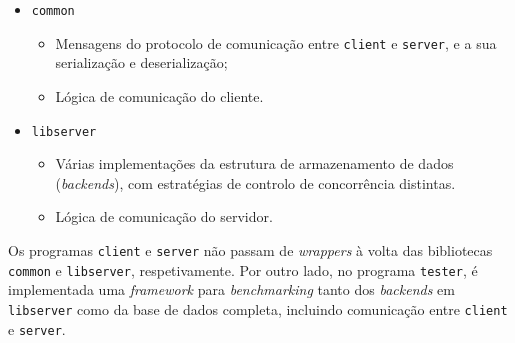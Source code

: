 \documentclass[12pt, a4paper, titlepage]{article}
\begin{document}
\begin{itemize}
    \item \texttt{common}
    \begin{itemize}
        \item Mensagens do protocolo de comunicação entre \texttt{client} e \texttt{server}, e a sua
            serialização e deserialização;

        \item Lógica de comunicação do cliente.
    \end{itemize}

    \item \texttt{libserver}
    \begin{itemize}
        \item Várias implementações da estrutura de armazenamento de dados (\emph{backends}), com
            estratégias de controlo de concorrência distintas.

        \item Lógica de comunicação do servidor.
    \end{itemize}
\end{itemize}

Os programas \texttt{client} e \texttt{server} não passam de \emph{wrappers} à volta das bibliotecas
\texttt{common} e \texttt{libserver}, respetivamente. Por outro lado, no programa \texttt{tester}, é
implementada uma \emph{framework} para \emph{benchmarking} tanto dos \emph{backends} em
\texttt{libserver} como da base de dados completa, incluindo comunicação entre \texttt{client} e
\texttt{server}.
\end{document}
